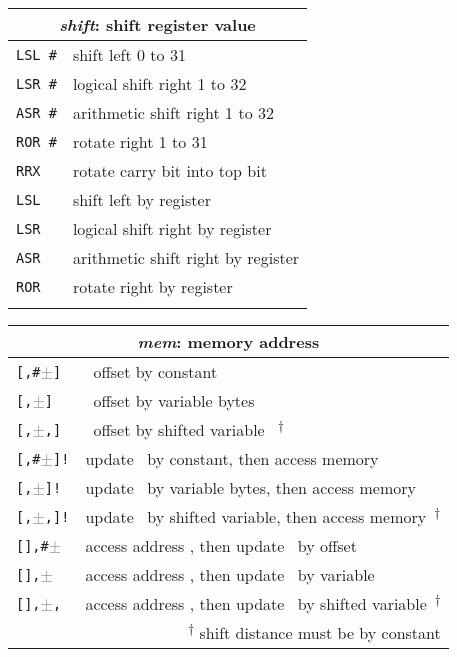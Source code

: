 \documentclass[a4paper,twoside,10pt]{article}
\begin{document}
	\def\code#1#2{\texttt{#1} & \small #2 \\}
	\begin{table}
	
		\begin{tabular}{l@{\hspace{3mm}}l}
			\multicolumn{2}{c}{\bfseries \emph{shift}: shift register value} \\
			\hline
			\code{LSL \#\imm[5]}{shift left 0 to 31}
			\code{LSR \#\imm[5]}{logical shift right 1 to 32}
			\code{ASR \#\imm[5]}{arithmetic shift right 1 to 32}
			\code{ROR \#\imm[5]}{rotate right 1 to 31}
			\code{RRX}{rotate carry bit into top bit}
			\code{LSL \reg}{shift left by register}
			\code{LSR \reg}{logical shift right by register}
			\code{ASR \reg}{arithmetic shift right by register}
			\code{ROR \reg}{rotate right by register}\hline
			\multicolumn{2}{r}{}\\
		\end{tabular}
		\hfill
		\begin{tabular}{l@{\hspace{3mm}}l}
			\multicolumn{2}{c}{\bfseries \emph{mem}: memory address} \\
			\hline
			\code{[\reg,\#\textcolor{gray}{$\pm$}\imm[12]]}{\reg\ offset by constant}
			\code{[\reg,\textcolor{gray}{$\pm$}\reg]}{\reg\ offset by variable bytes}
			\code{[\reg[a],\textcolor{gray}{$\pm$}\reg[b],\shift]}{\reg[a]\ offset by shifted variable \reg[b]\ \textsuperscript{$\dagger$}}
			\code{[\reg,\#\textcolor{gray}{$\pm$}\imm[12]]!}{update \reg\ by constant, then access memory}
			\code{[\reg,\textcolor{gray}{$\pm$}\reg]!}{update \reg\ by variable bytes, then access memory}
			\code{[\reg,\textcolor{gray}{$\pm$}\reg,\shift]!}{update \reg\ by shifted variable, then access memory\ \textsuperscript{$\dagger$}}
			\code{[\reg],\#\textcolor{gray}{$\pm$}\imm[12]}{access address \reg, then update \reg\ by offset}
			\code{[\reg],\textcolor{gray}{$\pm$}\reg}{access address \reg, then update \reg\ by variable}
			\code{[\reg],\textcolor{gray}{$\pm$}\reg,\shift}{access address \reg, then update \reg\ by shifted variable\ \textsuperscript{$\dagger$}}\hline
			\multicolumn{2}{r}{\footnotesize \textsuperscript{$\dagger$} shift distance must be by constant} \\
		\end{tabular}
	
	\end{table}
	
\end{document}

